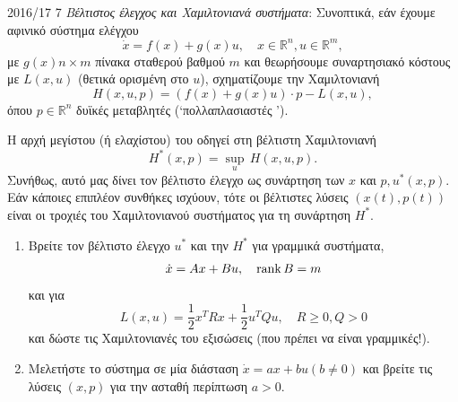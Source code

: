 \begin{exercise}{2016/17 7}
    \emph{Βέλτιστος έλεγχος και Χαμιλτονιανά συστήματα}: Συνοπτικά, εάν έχουμε
    αφινικό σύστημα ελέγχου
    \[
        \dot{x} = f(x) + g(x)u, \quad x \in \mathbb{R}^n, u \in \mathbb{R}^m,
    \]
    με \( g(x) n \times m \) πίνακα σταθερού βαθμού \( m \) και θεωρήσουμε
    συναρτησιακό κόστους με  \( L(x, u) \) (θετικά ορισμένη στο
    \( u \)), σχηματίζουμε την Χαμιλτονιανή
    \[
        H(x, u, p) = \left( f(x) + g(x)u \right)\cdot p - L(x, u),
    \]
    όπου \( p \in \mathbb{R}^n \) δυϊκές μεταβλητές
    (\enquote*{πολλαπλασιαστές }).

    Η αρχή μεγίστου (ή ελαχίστου) του  οδηγεί στη βέλτιστη
    Χαμιλτονιανή
    \[
    H^*(x, p) = \underset{u}\sup \, H(x, u, p).
    \]
    Συνήθως, αυτό μας δίνει τον βέλτιστο έλεγχο ως συνάρτηση των \( x \) και
    \( p, u^*(x, p) \). Εάν κάποιες επιπλέον συνθήκες ισχύουν, τότε οι βέλτιστες
    λύσεις \( (x(t), p(t)) \) είναι οι τροχιές του Χαμιλτονιανού συστήματος για
    τη συνάρτηση \( H^* \).
    \begin{enumerate}[label= (\alph*)]
        \item Βρείτε τον βέλτιστο έλεγχο \( u^* \) και την \( H^* \) για
            γραμμικά συστήματα,
            \[
                \dot{x} = Ax + Bu, \quad \operatorname{rank}{B} = m
            \]
            και για 
            \[
                L(x, u) = \frac{1}{2}x^{T}Rx + \frac{1}{2}u^{T}Qu, \quad R \geq
                0, Q >0
            \]
            και δώστε τις Χαμιλτονιανές του εξισώσεις (που πρέπει να είναι
            γραμμικές!).
        \item Μελετήστε το σύστημα σε μία διάσταση \( \dot{x} = ax + bu (b \neq
            0) \) και βρείτε τις λύσεις \( (x, p) \) για την ασταθή περίπτωση \(
            a > 0 \).
    \end{enumerate}
\end{exercise}
